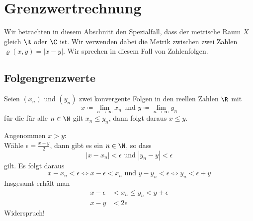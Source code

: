 \chapter{Grenzwertrechnung}
Wir betrachten in diesem Abschnitt den Spezialfall, dass der metrische Raum $X$ gleich $\R$ oder $\C$ ist. Wir verwenden dabei die Metrik zwischen zwei Zahlen $\varrho(x,y)=|x-y|$. Wir sprechen in diesem Fall von Zahlenfolgen.

\section{Folgengrenzwerte}
\begin{satz}{}
	Seien $(x_n)$ und $(y_n)$ zwei konvergente Folgen in den reellen Zahlen $\R$ mit
	\begin{equation*}
		x\coloneqq \lim\limits_{n\to\infty} x_n \text{ und } y\coloneqq \lim\limits_{n\to\infty} y_n
	\end{equation*}
	für die für alle $n\in\N$ gilt $x_n\leq y_n$, dann folgt daraus $x\leq y$.
\end{satz}
\beweis
Angenommen $x > y$:\\
Wähle $\epsilon =\frac{x-y}2$, dann gibt es ein $n\in\N$, so dass
\begin{equation*}
	|x-x_n|<\epsilon \text{ und } |y_n-y|<\epsilon
\end{equation*}
gilt. Es folgt daraus
\begin{equation*}
	x-x_n<\epsilon \Leftrightarrow x-\epsilon<x_n \text{ und } y-y_n<\epsilon \Leftrightarrow y_n<\epsilon + y
\end{equation*}
Insgesamt erhält man
\begin{align*}
	x-\epsilon &< x_n\leq y_n <y+\epsilon\\
	x-y&<2\epsilon
\end{align*}
Widerspruch!

